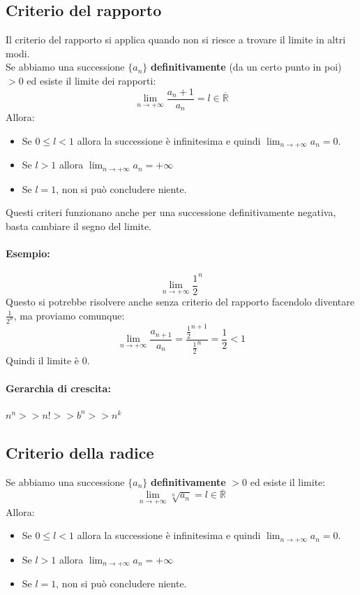 \documentclass[12pt,a4paper]{article}
\begin{document}
\subsection{Criterio del rapporto}
Il criterio del rapporto si applica quando non si riesce a trovare il limite in altri modi.\\
Se abbiamo una successione $\{a_{n}\}$ \textbf{definitivamente} (da un certo punto in poi) $> 0$ ed esiste il limite dei rapporti:
\[
\lim_{n \to +\infty} \frac{a_n + 1}{a_n} = l \in \overline{\mathbb{R}}
\]
Allora:
\begin{itemize}
  \item Se $0 \leq l < 1$ allora la successione è infinitesima e quindi $\lim_{n \to +\infty} a_n = 0$.
  \item Se $l > 1$ allora $\lim_{n \to +\infty} a_n = +\infty$
  \item Se $l = 1$, non si può concludere niente.
\end{itemize}
Questi criteri funzionano anche per una successione definitivamente negativa, basta cambiare il segno del limite.\\
\paragraph{Esempio:}
\[
\lim_{n \to +\infty} \frac{1}{2}^n
\]
Questo si potrebbe risolvere anche senza criterio del rapporto facendolo diventare $\frac{1}{2^n}$, ma proviamo comunque:
\[
\lim_{n \to +\infty} \frac{a_{n+1}}{a_n} = \frac{\frac{1}{2}^{n+1}}{\frac{1}{2}^n} = \frac{1}{2} < 1
\]
Quindi il limite è $0$.
\paragraph{Gerarchia di crescita:} $n^n >> n! >> b^n >> n^k$
\subsection{Criterio della radice}
Se abbiamo una successione $\{a_{n}\}$ \textbf{definitivamente} $> 0$ ed esiste il limite:
\[
\lim_{n \to +\infty} \sqrt[n]{a_n} = l \in \overline{\mathbb{R}}
\]
Allora:
\begin{itemize}
  \item Se $0 \leq l < 1$ allora la successione è infinitesima e quindi $\lim_{n \to +\infty} a_n = 0$.
  \item Se $l > 1$ allora $\lim_{n \to +\infty} a_n = +\infty$
  \item Se $l = 1$, non si può concludere niente.
\end{itemize}
\end{document}

